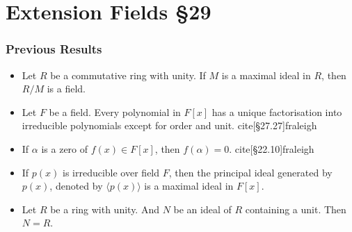 



\section{Extension Fields \S29}
\subsubsection*{Previous Results}
\begin{itemize}
	\item Let $R$ be a commutative ring with unity.
		If $M$ is a maximal ideal in $R$, then $R/M$ is a field.
		\cite[\S27.9]{fraleigh}
	\item Let $F$ be a field.
		Every polynomial in $F[x]$ has a unique factorisation into irreducible polynomials except for order and unit.
		cite[\S27.27]{fraleigh}
	\item If $\alpha$ is a zero of $f(x) \in F[x]$, then $f(\alpha) = 0$.
		cite[\S22.10]{fraleigh}
	\item If $p(x)$ is irreducible over field $F$, then the principal ideal generated by $p(x)$, denoted by $\langle p(x) \rangle$ is a maximal ideal in $F[x]$.
		\cite[\S27.25]{fraleigh}
	\item Let $R$ be a ring with unity.
		And $N$ be an ideal of $R$ containing a unit.
		Then $N = R$.\cite[\S27.5]{fraleigh}
\end{itemize}


